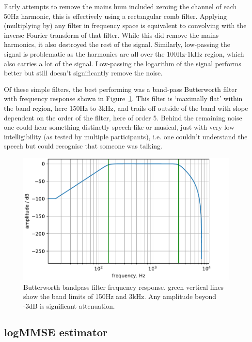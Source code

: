 \documentclass[prb,preprint]{revtex4-1}
\begin{document}
Early attempts to remove the mains hum included zeroing the channel of each 50Hz harmonic, this is effectively using a rectangular comb filter. Applying (multiplying by) any filter in frequency space is equivalent to convolving with the inverse Fourier transform of that filter. While this did remove the mains harmonics, it also destroyed the rest of the signal. Similarly, low-passing the signal is problematic as the harmonics are all over the 100Hz-1kHz region, which also carries a lot of the signal. Low-passing the logarithm of the signal performs better but still doesn’t significantly remove the noise.


Of these simple filters, the best performing was a band-pass Butterworth filter with frequency response shown in Figure~\ref{fig:butterworth}. This filter is `maximally flat' within the band region, here 150Hz to 3kHz, and trails off outside of the band with slope dependent on the order of the filter, here of order 5. Behind the remaining noise one could hear something distinctly speech-like or musical, just with very low intelligibility (as tested by multiple participants), i.e. one couldn’t understand the speech but could recognise that someone was talking.


\begin{figure}%
	\includegraphics[width=\textwidth]{butterworth_150_3000-cropped.pdf}
	\caption{Butterworth bandpass filter frequency response, green vertical lines show the band limits of 150Hz and 3kHz. Any amplitude beyond -3dB is significant attenuation.}
	\label{fig:butterworth}
\end{figure}

\subsection{logMMSE estimator}
\end{document}
